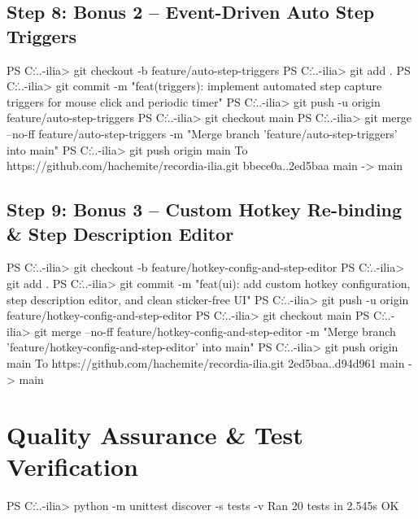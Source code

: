 \documentclass[10pt,a4paper]{article}
\begin{document}
\subsection{Step 8: Bonus 2 -- Event-Driven Auto Step Triggers}
\begin{terminalbox}
PS C:\...\recordia-ilia> git checkout -b feature/auto-step-triggers
PS C:\...\recordia-ilia> git add .
PS C:\...\recordia-ilia> git commit -m "feat(triggers): implement automated step capture triggers for mouse click and periodic timer"
PS C:\...\recordia-ilia> git push -u origin feature/auto-step-triggers
PS C:\...\recordia-ilia> git checkout main
PS C:\...\recordia-ilia> git merge --no-ff feature/auto-step-triggers -m "Merge branch 'feature/auto-step-triggers' into main"
PS C:\...\recordia-ilia> git push origin main
To https://github.com/hachemite/recordia-ilia.git
   bbece0a..2ed5baa  main -> main
\end{terminalbox}

\subsection{Step 9: Bonus 3 -- Custom Hotkey Re-binding \& Step Description Editor}
\begin{terminalbox}
PS C:\...\recordia-ilia> git checkout -b feature/hotkey-config-and-step-editor
PS C:\...\recordia-ilia> git add .
PS C:\...\recordia-ilia> git commit -m "feat(ui): add custom hotkey configuration, step description editor, and clean sticker-free UI"
PS C:\...\recordia-ilia> git push -u origin feature/hotkey-config-and-step-editor
PS C:\...\recordia-ilia> git checkout main
PS C:\...\recordia-ilia> git merge --no-ff feature/hotkey-config-and-step-editor -m "Merge branch 'feature/hotkey-config-and-step-editor' into main"
PS C:\...\recordia-ilia> git push origin main
To https://github.com/hachemite/recordia-ilia.git
   2ed5baa..d94d961  main -> main
\end{terminalbox}

\newpage
\section{Quality Assurance \& Test Verification}
\begin{terminalbox}
PS C:\...\recordia-ilia> python -m unittest discover -s tests -v
Ran 20 tests in 2.545s
OK
\end{terminalbox}
\end{document}
